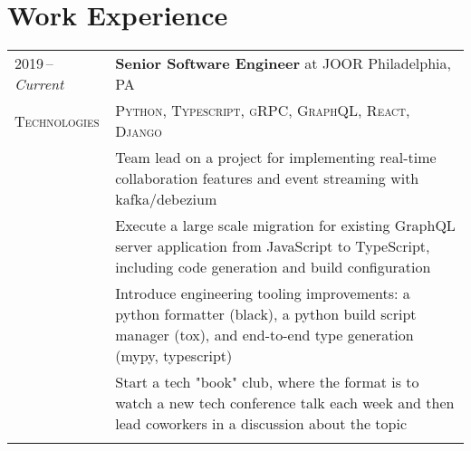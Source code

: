 \documentclass[a4paper,12pt]{article}
\begin{document}
\section{Work Experience}
\begin{tabularx}{\textwidth}{@{\extracolsep{2pt}}p{6em}|X@{}}
    2019\,--\,\emph{Current} & \textbf{Senior Software Engineer} at \textsc{JOOR} \hfill Philadelphia, PA                                                                                                   \\
    \textsc{Technologies}    & \textsc{Python}, \textsc{Typescript}, \textsc{gRPC}, \textsc{GraphQL}, \textsc{React}, \textsc{Django}                                                                       \\
                             & \footnotesize Team lead on a project for implementing real-time collaboration features and event streaming with kafka/debezium                                               \\
                             & \footnotesize Execute a large scale migration for existing GraphQL server application from JavaScript to TypeScript, including code generation and build configuration       \\
                             & \footnotesize Introduce engineering tooling improvements: a python formatter (black), a python build script manager (tox), and end-to-end type generation (mypy, typescript) \\
                             & \footnotesize Start a tech "book" club, where the format is to watch a new tech conference talk each week and then lead coworkers in a discussion about the topic            \\

    \multicolumn{2}{c}{}                                                                                                                                                                                    \\


\end{tabularx}
\end{document}
